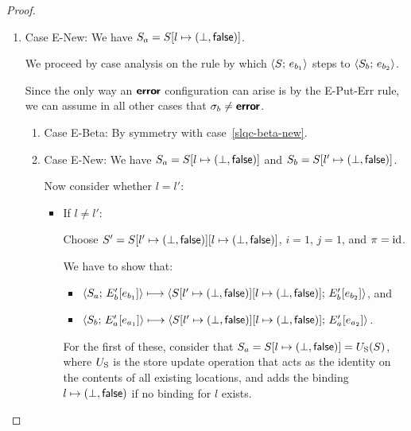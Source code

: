 \begin{proof}
\begin{enumerate}
\begin{enumerate}
    \end{enumerate}
  \item Case {\sc E-New}: We have $S_a = S[l \mapsto (\bot, \textsf{false})]$.

    We proceed by case analysis on the rule by which
    $\langle S;\, e_{b_1} \rangle$ steps to $\langle S_b;\, e_{b_2} \rangle$.

    Since the only way an $\textbf{\textsf{error}}$ configuration can arise is by the
    {\sc E-Put-Err} rule, we can assume in all other cases that
    $\sigma_b \neq \textbf{\textsf{error}}$.
    \begin{enumerate}
    \item \label{slqc-new-beta}Case {\sc E-Beta}: By symmetry with case~\ref{slqc-beta-new}.
    \item \label{slqc-new-new}Case {\sc E-New}: We have $S_a =
      S[l \mapsto (\bot, \textsf{false})]$ and $S_b =
      S[l' \mapsto (\bot, \textsf{false})]$.

      Now consider whether $l = l'$:
      \begin{itemize}
      \item If $l \neq l'$:

        Choose $S' =
        S[l' \mapsto (\bot, \textsf{false})][l \mapsto (\bot, \textsf{false})]$,
        $i = 1$, $j = 1$, and $\pi = \mathrm{id}$.

        We have to show that:
        \begin{itemize}
        \item $\langle S_a;\, E'_b\hspace{-0.5mm}\left[e_{b_1}\right] \rangle \longmapsto
          \langle S[l' \mapsto (\bot, \textsf{false})][l \mapsto (\bot, \textsf{false})];\, E'_b\hspace{-0.5mm}\left[e_{b_2}\right] \rangle$,
          and
        \item $\langle S_b;\, E'_a\hspace{-0.5mm}\left[e_{a_1}\right] \rangle \longmapsto
          \langle S[l' \mapsto (\bot, \textsf{false})][l \mapsto (\bot, \textsf{false})];\, E'_a\hspace{-0.5mm}\left[e_{a_2}\right] \rangle$.
        \end{itemize}

        For the first of these, consider that $S_a =
        S[l \mapsto (\bot, \textsf{false})] = U_{\mathrm{S}}(S)$, where $U_{\mathrm{S}}$ is
        the store update operation that acts as the identity on the
        contents of all existing locations, and adds the binding
        $l \mapsto (\bot, \textsf{false})$ if no binding for $l$
        exists.


\end{itemize}
\end{enumerate}
\end{enumerate}
\end{proof}
